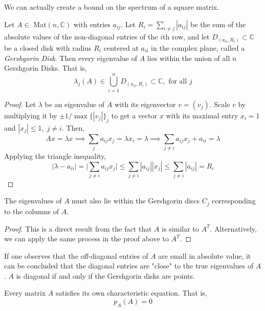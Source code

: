 \documentclass{article}
\begin{document}
    We can actually create a bound on the spectrum of a square matrix. 

    \begin{theorem}
    Let $A \in $ Mat$(n, \mathbb{C})$ with entries $a_{i j}$. Let $R_i = \sum_{i \neq j} |a_{i j}|$ be the sum of the absolute values of the non-diagonal entries of the $i$th row, and let $D_(a_{i i}, R_i) \subset \mathbb{C}$ be a closed disk with radius $R_i$ centered at $a_{i i}$ in the complex plane, called a \textit{Gershgorin Disk}. Then every eigenvalue of $A$ lies within the union of all $n$ Gershgorin Disks. That is, 
    \[ \lambda_j (A) \in \bigcup_{i= 1}^{n} D_(a_{i i}, R_i) \subset \mathbb{C}, \text{ for all } j\]
    \end{theorem}

    \begin{proof}
    Let $\lambda$ be an eigenvalue of $A$ with its eigenvector $v = (v_j)$. Scale $v$ by multiplying it by $ \pm 1 / \max{\{|v_j|\}_j}$ to get a vector $x$ with its maximal entry $x_i = 1$ and $|x_j| \leq 1, \; j \neq i$. Then, 
    \[A x = \lambda x \implies \sum_{j} a_{i j} x_j = \lambda x_i = \lambda \implies \sum_{j \neq i} a_{i j} x_j + a_{i i} = \lambda\]
    Applying the triangle inequality, 
    \[| \lambda - a_{i i} | = \bigg| \sum_{j \neq i} a_{i j} x_j\bigg| \leq \sum_{j \neq i} |a_{i j}| |x_j| \leq \sum_{j \neq i} |a_{i j}| = R_i\]
    \end{proof}

    \begin{corollary}
    The eigenvalues of $A$ must also lie within the Gershgorin discs $C_j$ corresponding to the columns of $A$. 
    \end{corollary}

    \begin{proof}
    This is a direct result from the fact that $A$ is similar to $A^T$. Alternatively, we can apply the same process in the proof above to $A^T$.
    \end{proof} 

    If one observes that the off-diagonal entries of $A$ are small in absolute value, it can be concluded that the diagonal entries are "close" to the true eigenvalues of $A$. $A$ is diagonal if and only if the Gershgorin disks are points. 

    \begin{theorem}
    Every matrix $A$ satisfies its own characteristic equation. That is, 
    \[ p_{A}(A) = 0\]\
    \end{theorem} 
\end{document}
